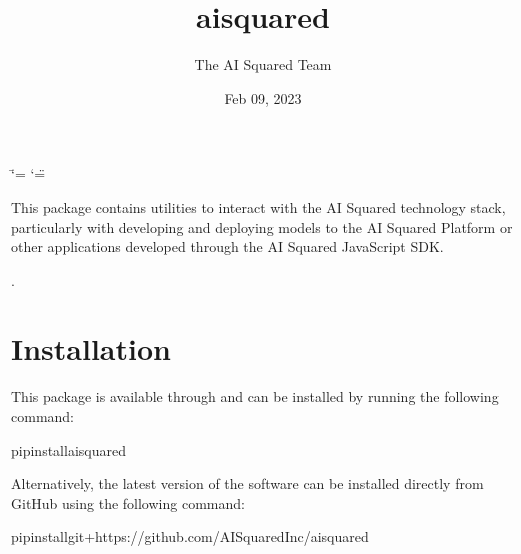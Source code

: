 \documentclass[letterpaper,10pt,english]{sphinxmanual}
\title{aisquared}
\date{Feb 09, 2023}
\author{The AI Squared Team}
\let\sphinxpxdimen\pdfpxdimen\else\newdimen\sphinxpxdimen
\begin{document}
\ifdefined\shorthandoff
  \ifnum\catcode`\=\string=\active\shorthandoff{=}\fi
  \ifnum\catcode`\"=\active{}\fi
\fi

\pagestyle{empty}
\sphinxmaketitle
\pagestyle{plain}
\sphinxtableofcontents
\pagestyle{normal}
\label{\detokenize{index::doc}}
\noindent{\hspace*{\fill}\sphinxincludegraphics[width=400\sphinxpxdimen]{{aisquared}.png}\hspace*{\fill}}

\begin{DUlineblock}{0em}
\item[] 
\item[] 
\end{DUlineblock}



\sphinxAtStartPar
This package contains utilities to interact with the AI Squared technology stack, particularly with developing and deploying models to the AI Squared Platform or other applications developed through the AI Squared JavaScript SDK.

\sphinxAtStartPar
{} 

\sphinxAtStartPar
{}.

\begin{DUlineblock}{0em}
\item[] 
\end{DUlineblock}


\chapter{Installation}
\label{\detokenize{index:installation}}
\sphinxAtStartPar
This package is available through  and can be installed by running the following command:

\begin{sphinxVerbatim}[commandchars=\\\{\}]
pipinstallaisquared
\end{sphinxVerbatim}

\sphinxAtStartPar
Alternatively, the latest version of the software can be installed directly from GitHub using the following command:

\begin{sphinxVerbatim}[commandchars=\\\{\}]
pipinstallgit+https://github.com/AISquaredInc/aisquared
\end{sphinxVerbatim}
\end{document}
